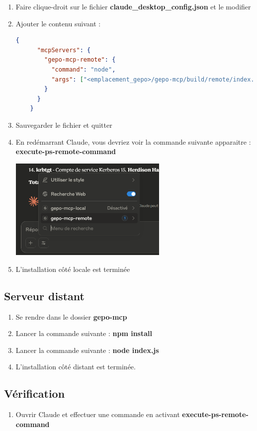 \begin{enumerate}
    \item Faire clique-droit sur le fichier \textbf{claude\_desktop\_config.json} et le modifier    
    \item Ajouter le contenu suivant : 
    
    \begin{lstlisting}[language=json,firstnumber=1]
    {
      "mcpServers": {
        "gepo-mcp-remote": {
          "command": "node", 
          "args": ["<emplacement_gepo>/gepo-mcp/build/remote/index.js"]
        }
      }
    }
    \end{lstlisting}

    \item Sauvegarder le fichier et quitter
    \item En redémarrant Claude, vous devriez voir la commande suivante apparaitre : \textbf{execute-ps-remote-command}
    
    \includegraphics[width=0.6\textwidth]{../images/execute_ps_remote_command-claude}

    \item L'installation côté locale est terminée

\end{enumerate}

\subsection*{Serveur distant}

\begin{enumerate}
    \item Se rendre dans le dossier \textbf{gepo-mcp}
    \item Lancer la commande suivante : \textbf{npm install}
    \item Lancer la commande suivante : \textbf{node index.js}
    \item L'installation côté distant est terminée.
\end{enumerate}

\subsection*{Vérification}

\begin{enumerate}
    \item Ouvrir Claude et effectuer une commande en activant \textbf{execute-ps-remote-command}
\end{enumerate}